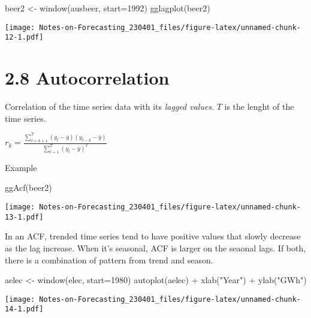 \documentclass[
]{article}
\newenvironment{Shaded}{\begin{snugshade}}{\end{snugshade}}
\newcommand{\AttributeTok}[1]{\textcolor[rgb]{0.77,0.63,0.00}{#1}}
\newcommand{\DecValTok}[1]{\textcolor[rgb]{0.00,0.00,0.81}{#1}}
\newcommand{\FunctionTok}[1]{\textcolor[rgb]{0.00,0.00,0.00}{#1}}
\newcommand{\NormalTok}[1]{#1}
\newcommand{\OtherTok}[1]{\textcolor[rgb]{0.56,0.35,0.01}{#1}}
\newcommand{\SpecialCharTok}[1]{\textcolor[rgb]{0.00,0.00,0.00}{#1}}
\newcommand{\StringTok}[1]{\textcolor[rgb]{0.31,0.60,0.02}{#1}}
\begin{document}
\begin{Shaded}
\begin{Highlighting}[]
\NormalTok{beer2 }\OtherTok{\textless{}{-}} \FunctionTok{window}\NormalTok{(ausbeer, }\AttributeTok{start=}\DecValTok{1992}\NormalTok{)}
\FunctionTok{gglagplot}\NormalTok{(beer2)}
\end{Highlighting}
\end{Shaded}

\texttt{[image: Notes-on-Forecasting\_230401\_files/figure-latex/unnamed-chunk-12-1.pdf]}

\hypertarget{autocorrelation}{%
\section{2.8 Autocorrelation}\label{autocorrelation}}

Correlation of the time series data with its \emph{lagged values}. \(T\)
is the lenght of the time series.

\(r_k = \frac{\sum_{t=k+1}^T(y_t-\bar{y})(y_{t-k}-\bar{y})}{\sum_{t=1}^T(y_t-\bar{y})^2}\)

Example

\begin{Shaded}
\begin{Highlighting}[]
\FunctionTok{ggAcf}\NormalTok{(beer2)}
\end{Highlighting}
\end{Shaded}

\texttt{[image: Notes-on-Forecasting\_230401\_files/figure-latex/unnamed-chunk-13-1.pdf]}

In an ACF, trended time series tend to have positive values that slowly
decrease as the lag increase. When it's seasonal, ACF is larger on the
seaonal lags. If both, there is a combination of pattern from trend and
season.

\begin{Shaded}
\begin{Highlighting}[]
\NormalTok{aelec }\OtherTok{\textless{}{-}} \FunctionTok{window}\NormalTok{(elec, }\AttributeTok{start=}\DecValTok{1980}\NormalTok{)}
\FunctionTok{autoplot}\NormalTok{(aelec) }\SpecialCharTok{+} \FunctionTok{xlab}\NormalTok{(}\StringTok{"Year"}\NormalTok{) }\SpecialCharTok{+} \FunctionTok{ylab}\NormalTok{(}\StringTok{"GWh"}\NormalTok{)}
\end{Highlighting}
\end{Shaded}

\texttt{[image: Notes-on-Forecasting\_230401\_files/figure-latex/unnamed-chunk-14-1.pdf]}
\end{document}
